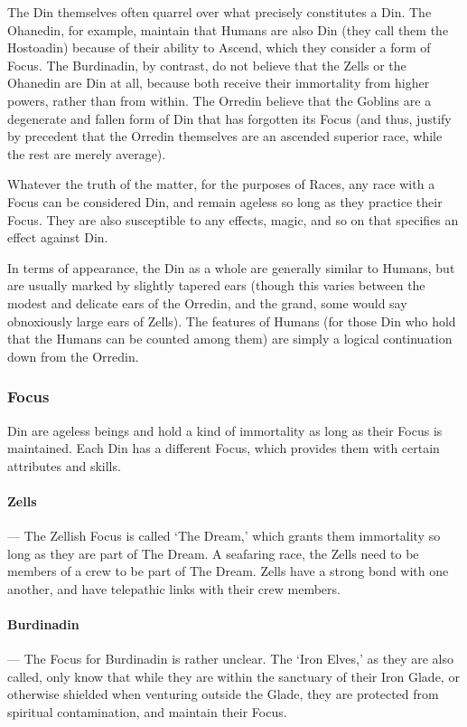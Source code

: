 \documentclass[oneside,11pt,english]{book}
\begin{document}
The Din themselves often quarrel over what precisely constitutes a Din. The
Ohanedin, for example, maintain that Humans are also Din (they call them the
Hostoadin) because of their ability to Ascend, which they consider a form of
Focus. The Burdinadin, by contrast, do not believe that the Zells or the
Ohanedin are Din at all, because both receive their immortality from higher
powers, rather than from within. The Orredin believe that the Goblins are a
degenerate and fallen form of Din that has forgotten its Focus (and thus,
justify by precedent that the Orredin themselves are an ascended superior race,
while the rest are merely average).

Whatever the truth of the matter, for the purposes of Races, any race with a
Focus can be considered Din, and remain ageless so long as they practice their
Focus. They are also susceptible to any effects, magic, and so on that specifies
an effect against Din.

In terms of appearance, the Din as a whole are generally similar to Humans, but
are usually marked by slightly tapered ears (though this varies between the
modest and delicate ears of the Orredin, and the grand, some would say
obnoxiously large ears of Zells). The features of Humans (for those Din who hold
that the Humans can be counted among them) are simply a logical continuation
down from the Orredin.

\subsubsection{Focus}
Din are ageless beings and hold a kind of immortality as long as their Focus is
maintained. Each Din has a different Focus, which provides them with certain
attributes and skills.

\paragraph*{Zells}---\quad
The Zellish Focus is called ‘The Dream,’ which grants them immortality so long as they are part of The Dream. A seafaring race, the Zells need to be members of a crew to be part of The Dream. Zells have a strong bond with one another, and have telepathic links with their crew members.

\paragraph*{Burdinadin}---\quad
The Focus for Burdinadin is rather unclear. The ‘Iron Elves,’ as they are also called, only know that while they are within the sanctuary of their Iron Glade, or otherwise shielded when venturing outside the Glade, they are protected from spiritual contamination, and maintain their Focus.
\end{document}
